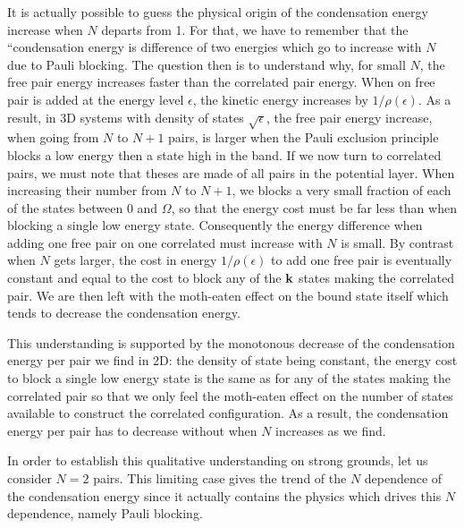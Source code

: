 \documentclass[aps,prb,showpacs,reprint]{revtex4-1}
\begin{document}
It is actually possible to guess the physical origin of the condensation energy increase when $N$ departs from 1.  For that, we have to remember that the ``condensation energy is difference of two energies which go to increase with $N$ due to Pauli blocking.  The question then is to understand why, for small $N$, the free pair energy increases faster than the correlated pair energy.  When on free pair is added at the energy level $\epsilon$, the kinetic energy increases by $1/\rho(\epsilon)$.  As a result, in 3D systems with density of states $\sqrt{\epsilon}$, the free pair energy increase, when going from $N$ to $N+1$ pairs, is larger when the Pauli exclusion principle blocks a low energy then a state high in the band.  If we now turn to correlated pairs, we must note that theses are made of all pairs in the potential layer. When increasing their number from $N$ to $N+1$, we blocks a very small fraction of each of the states between $0$ and $\Omega$, so that the energy cost must be far less than when blocking a single low energy state.  Consequently the energy difference when adding one free pair on one correlated must increase with $N$ is small. By contrast when $N$ gets larger, the cost in energy $1/\rho(\epsilon)$ to add one free pair is eventually constant and equal to the cost to block any of the $\mathbf{k}$ states making the correlated pair.  We are then left with the moth-eaten effect on the bound state itself which tends to decrease the condensation energy. 

This understanding is supported by the monotonous decrease of the condensation energy per pair we find in 2D: the density of state being constant, the energy cost to block a single low energy state is the same as for any of the states making the correlated pair so that we only feel the moth-eaten effect on the number of states available to construct the correlated configuration.  As a result, the condensation energy per pair has to decrease without when $N$ increases as we find.  

In order to establish this qualitative understanding on strong grounds, let us consider $N=2$ pairs. This limiting case gives the trend of the $N$ dependence of the condensation energy since it actually contains the physics which drives this $N$ dependence, namely Pauli blocking.  
\end{document}

